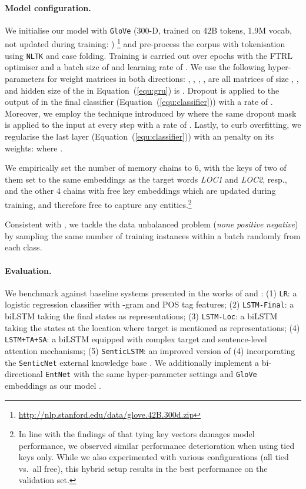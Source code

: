 \documentclass[11pt,a4paper]{article}
\newcommand{\system}[2][]{\texttt{#2#1}\xspace}
\newcommand{\equref}[2][]{Equation#1~\bracketref{#2}}
\newcommand{\bracketref}[1]{(\ref{#1})\xspace}
\newcommand{\ent}[1][]{\system[#1]{EntNet}}
\begin{document}
\paragraph{Model configuration.}
We initialise our model with \system{GloVe} (300-D, trained on 42B tokens, 1.9M vocab, not updated during training: )
\footnote{\url{http://nlp.stanford.edu/data/glove.42B.300d.zip}} 
and pre-process the corpus with tokenisation using \system{NLTK} \cite{Bird+:2009} and case folding. 
Training is carried out over  epochs with the FTRL optimiser \cite{Mcmahan+:2013} and a batch size of  and learning rate of . We use the following hyper-parameters for weight matrices in both directions: , , , ,  are all matrices of size , , and hidden size of the  in \equref{equ:gru} is . Dropout is applied to the output of  in the final classifier (\equref{equ:classifier}) with a rate of . Moreover, we employ the technique introduced by  where the same dropout mask is applied to the input  at every step with a rate of . Lastly, to curb overfitting, we regularise the last layer (\equref{equ:classifier}) with an  penalty on its weights:  where .

We empirically set the number of memory chains to 6, with the keys of two of them set to the same embeddings as the target words \textit{LOC1} and \textit{LOC2}, resp., and the other 4 chains with free key embeddings which are updated during training, and therefore free to capture any entities.\footnote{In line with the findings of  that tying key vectors damages model performance, we observed similar performance deterioration when using tied keys only. While we also experimented with various configurations (all tied vs.\ all free), this hybrid setup results in the best performance on the validation set.}

Consistent with , we tackle the data unbalanced problem (\textit{none}  \textit{positive}  \textit{negative}) by sampling the same number of training instances within a batch randomly from each class.

\paragraph{Evaluation.}
We benchmark against baseline systems presented in the works of  and : (1) \system{LR}: a logistic regression classifier with -gram and POS tag features; (2) \system{LSTM-Final}: a biLSTM taking the final states as representations; (3) \system{LSTM-Loc}: a biLSTM taking the states at the location where target  is mentioned as representations; (4) \system{LSTM+TA+SA}: a biLSTM equipped with complex target and sentence-level attention mechanisms; (5) \system{SenticLSTM}: an improved version of (4) incorporating the \system{SenticNet} external knowledge base \cite{Cambria+:2016}. We additionally implement a bi-directional \ent with the same hyper-parameter settings and \system{GloVe} embeddings as our model \cite{Mikael+:2017}.
\end{document}
